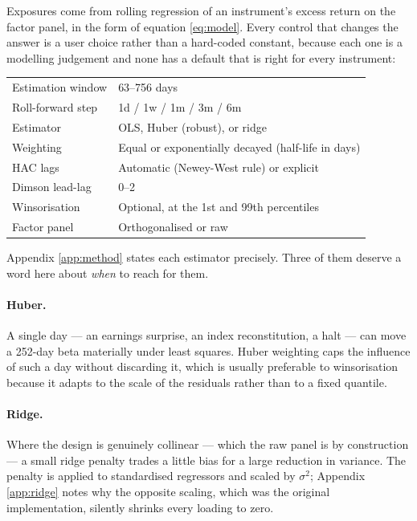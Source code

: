 \documentclass[11pt,a4paper]{article}
\begin{document}
Exposures come from rolling regression of an instrument's excess return on the factor
panel, in the form of equation \eqref{eq:model}. Every control that changes the answer
is a user choice rather than a hard-coded constant, because each one is a modelling
judgement and none has a default that is right for every instrument:

\begin{center}
\small
\begin{tabular}{@{}ll@{}}
\toprule
Estimation window & 63--756 days \\
Roll-forward step & 1d / 1w / 1m / 3m / 6m \\
Estimator & OLS, Huber (robust), or ridge \\
Weighting & Equal or exponentially decayed (half-life in days) \\
HAC lags & Automatic (Newey-West rule) or explicit \\
Dimson lead-lag & 0--2 \\
Winsorisation & Optional, at the 1st and 99th percentiles \\
Factor panel & Orthogonalised or raw \\
\bottomrule
\end{tabular}
\end{center}

Appendix \ref{app:method} states each estimator precisely. Three of them deserve a
word here about \emph{when} to reach for them.

\paragraph{Huber.} A single day --- an earnings surprise, an index reconstitution, a
halt --- can move a 252-day beta materially under least squares. Huber weighting caps
the influence of such a day without discarding it, which is usually preferable to
winsorisation because it adapts to the scale of the residuals rather than to a fixed
quantile.

\paragraph{Ridge.} Where the design is genuinely collinear --- which the raw panel is
by construction --- a small ridge penalty trades a little bias for a large reduction in
variance. The penalty is applied to standardised regressors and scaled by $\sigma^2$;
Appendix \ref{app:ridge} notes why the opposite scaling, which was the original
implementation, silently shrinks every loading to zero.
\end{document}
